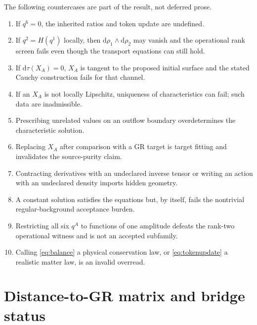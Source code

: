 \documentclass[11pt]{article}
\newcommand{\dd}{\mathrm d}
\begin{document}
The following countercases are part of the result, not deferred prose.
\begin{enumerate}[leftmargin=*]
  \item If $q^6=0$, the inherited ratios and token update are undefined.
  \item If $q^2=H(q^1)$ locally, then
        $\dd\rho_1\wedge\dd\rho_2$ may vanish and the operational rank screen
        fails even though the transport equations can still hold.
  \item If $\dd\tau(X_A)=0$, $X_A$ is tangent to the proposed initial surface
        and the stated Cauchy construction fails for that channel.
  \item If an $X_A$ is not locally Lipschitz, uniqueness of characteristics
        can fail; such data are inadmissible.
  \item Prescribing unrelated values on an outflow boundary overdetermines the
        characteristic solution.
  \item Replacing $X_A$ after comparison with a GR target is target fitting and
        invalidates the source-purity claim.
  \item Contracting derivatives with an undeclared inverse tensor or writing
        an action with an undeclared density imports hidden geometry.
  \item A constant solution satisfies the equations but, by itself, fails the
        nontrivial regular-background acceptance burden.
  \item Restricting all six $q^A$ to functions of one amplitude defeats the
        rank-two operational witness and is not an accepted subfamily.
  \item Calling \eqref{eq:balance} a physical conservation law, or
        \eqref{eq:tokenupdate} a realistic matter law, is an invalid overread.
\end{enumerate}

\section{Distance-to-GR matrix and bridge status}
\end{document}
